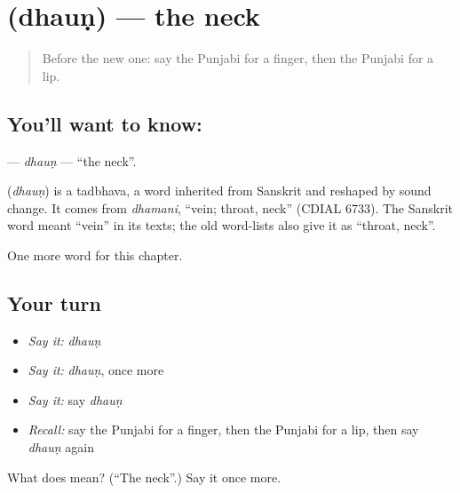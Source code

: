 \section[\texorpdfstring{\pa{ਧੌਣ} (dhauṇ)}{ਧੌਣ (dhauṇ)}]{ (dhauṇ) — the neck}

\label{lesson:PA-C50-dhaun}



\begin{quote}
Before the new one: say the Punjabi for a finger, then the Punjabi for a lip.
\end{quote}

\subsection*{You'll want to know: }
\textbf{} — \emph{dhauṇ} — \textquotedblleft{}the neck\textquotedblright{}.

\begin{cousinweb}
\textbf{} (\emph{dhauṇ}) is a tadbhava, a word inherited from Sanskrit and reshaped by sound change. It comes from \emph{dhamani}, \textquotedblleft{}vein; throat, neck\textquotedblright{} (CDIAL 6733). The Sanskrit word meant \textquotedblleft{}vein\textquotedblright{} in its texts; the old word-lists also give it as \textquotedblleft{}throat, neck\textquotedblright{}.
\end{cousinweb}

\begin{grammarlens}[title={What you've built}]
One more word for this chapter.
\end{grammarlens}

\subsection*{Your turn}
\begin{itemize}
\raggedright
  \item \emph{Say it:} \emph{dhauṇ}
  \item \emph{Say it:} \emph{dhauṇ}, once more
  \item \emph{Say it:} say \emph{dhauṇ}
  \item \emph{Recall:} say the Punjabi for a finger, then the Punjabi for a lip, then say \emph{dhauṇ} again
\end{itemize}

\begin{tcolorbox}[breakable,colback=teal!4,colframe=teal!35!black,title={Before you move on}]
What does  mean? (\textquotedblleft{}The neck\textquotedblright{}.) Say it once more.
\end{tcolorbox}
